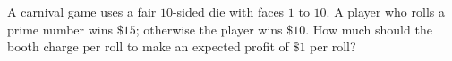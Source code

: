 A carnival game uses a fair $10$-sided die with faces $1$ to $10$. A player who rolls a prime number wins $\$15$; otherwise the player wins $\$10$. How much should the booth charge per roll to make an expected profit of $\$1$ per roll?
